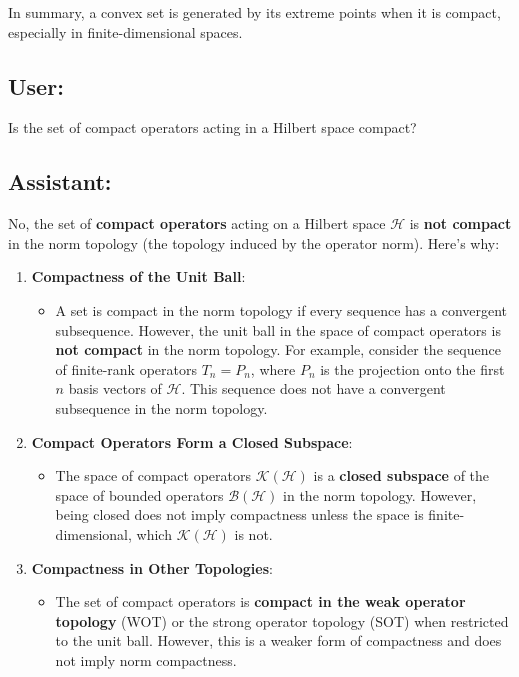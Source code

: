 \documentclass{article}
\begin{document}
In summary, a convex set is generated by its extreme points when it is
compact, especially in finite-dimensional spaces.

\subsection*{User:}

Is the set of compact operators acting in a Hilbert space compact?

\subsection*{Assistant:}

No, the set of \textbf{compact operators} acting on a Hilbert space $%
\mathcal{H}$ is \textbf{not compact} in the norm topology (the topology
induced by the operator norm). Here's why:

\begin{enumerate}
\item \textbf{Compactness of the Unit Ball}: 

\begin{itemize}
\item A set is compact in the norm topology if every sequence has a
convergent subsequence. However, the unit ball in the space of compact
operators is \textbf{not compact} in the norm topology. For example,
consider the sequence of finite-rank operators $T_n = P_n$, where $P_n$ is
the projection onto the first $n$ basis vectors of $\mathcal{H}$. This
sequence does not have a convergent subsequence in the norm topology. 
\end{itemize}

\item \textbf{Compact Operators Form a Closed Subspace}: 

\begin{itemize}
\item The space of compact operators $\mathcal{K}(\mathcal{H})$ is a \textbf{%
closed subspace} of the space of bounded operators $\mathcal{B}(\mathcal{H})$
in the norm topology. However, being closed does not imply compactness
unless the space is finite-dimensional, which $\mathcal{K}(\mathcal{H})$ is
not. 
\end{itemize}

\item \textbf{Compactness in Other Topologies}: 

\begin{itemize}
\item The set of compact operators is \textbf{compact in the weak operator
topology} (WOT) or the strong operator topology (SOT) when restricted to the
unit ball. However, this is a weaker form of compactness and does not imply
norm compactness. 
\end{itemize}
\end{enumerate}
\end{document}
